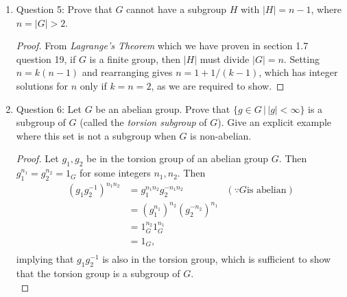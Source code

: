 \documentclass{article}
\begin{document}
\begin{enumerate}
\begin{enumerate}
      \item Question 5: Prove that $G$ cannot have a subgroup $H$ with
        $|H|=n-1$, where $n=|G|>2$.

        \begin{proof}
          From \textit{Lagrange's Theorem} which we have proven in section
          1.7 question 19, if $G$ is a finite group, then $|H|$ must divide
          $|G|=n$. Setting $n=k(n-1)$ and rearranging gives $n=1+1/(k-1)$,
          which has integer solutions for $n$ only if $k=n=2$, as we are
          required to show.
        \end{proof}

      \item Question 6: Let $G$ be an abelian group. Prove that $\{g\in
        G\,|\,|g|<\infty\}$ is a subgroup of $G$ (called the
        \textit{torsion subgroup} of $G$). Give an explicit example
        where this set is not a subgroup when $G$ is non-abelian.

        \begin{proof}
          Let $g_1,g_2$ be in the torsion group of an abelian group $G$.
          Then $g_1^{n_1}=g_2^{n_2}=1_G$ for some integers $n_1,n_2$. Then
          \begin{align*}
            (g_1g_2^{-1})^{n_1n_2} & = g_1^{n_1n_2}g_2^{-n_1n_2} & (\because G \text{is abelian}) \\
                                   & = (g_1^{n_1})^{n_2}(g_2^{-n_2})^{n_1} & \\
                                   & = 1_G^{n_2}1_G^{n_1} & \\
                                   & = 1_G,               & \\
          \end{align*}
          implying that $g_1g_2^{-1}$ is also in the torsion group, which
          is sufficient to show that the torsion group is a subgroup of
          $G$. \\


\end{proof}
\end{enumerate}
\end{enumerate}
\end{document}
